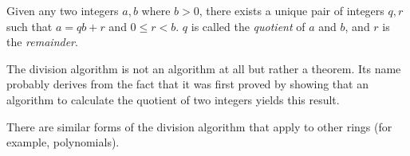 \documentclass[12pt]{article}
\begin{document}
Given any two integers $a,b$ where $b > 0$, there exists a unique pair of integers $q,r$ such that $a = qb + r$ and $0 \leq r < b$.  $q$ is called the \emph{quotient} of $a$ and $b$, and $r$ is the \emph{remainder}.

The division algorithm is not an algorithm at all but rather a theorem.  Its name probably derives from the fact that it was first proved by showing that an algorithm to calculate the quotient of two integers yields this result.

There are similar forms of the division algorithm that apply to other rings (for example, polynomials).
\end{document}
